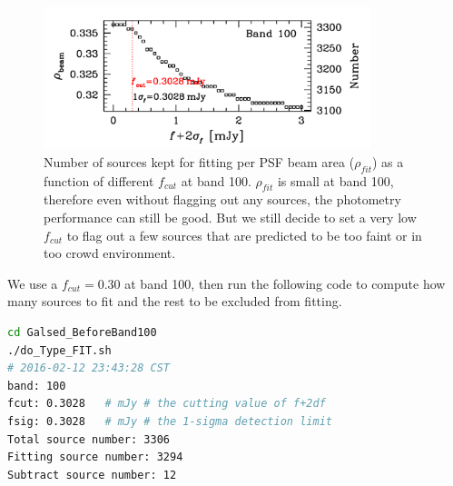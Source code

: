 \documentclass[11pt,a4paper]{article}
\begin{document}
\begin{figure}[H]
	\caption{Number of sources kept for fitting per PSF beam area ($\rho_{fit}$) as a function of different $f_{cut}$ at band 100. $\rho_{fit}$ is small at band 100, therefore even without flagging out any sources, the photometry performance can still be good. But we still decide to set a very low $f_{cut}$ to flag out a few sources that are predicted to be too faint or in too crowd environment.}
	\includegraphics[width=0.85\textwidth]{plot_cutting_flux_100}
\end{figure}

We use a $f_{cut} = 0.30$ at band 100, then run the following code to compute how many sources to fit and the rest to be excluded from fitting. 

\begin{lstlisting}[language=bash]
cd Galsed_BeforeBand100
./do_Type_FIT.sh
# 2016-02-12 23:43:28 CST
band: 100
fcut: 0.3028   # mJy # the cutting value of f+2df
fsig: 0.3028   # mJy # the 1-sigma detection limit
Total source number: 3306
Fitting source number: 3294
Subtract source number: 12
\end{lstlisting}
\end{document}
